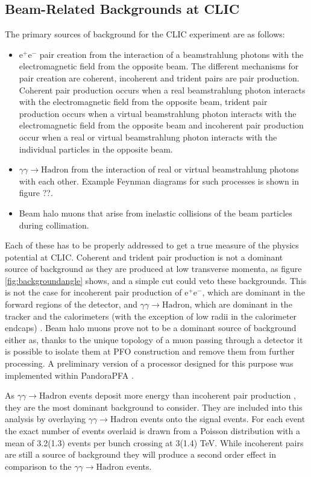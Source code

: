\subsection{Beam-Related Backgrounds at CLIC}
The primary sources of background for the CLIC experiment are as follows:
\begin{itemize}
\item $\text{e}^{+}\text{e}^{-}$ pair creation from the interaction of a beamstrahlung photons with the electromagnetic field from the opposite beam.  The different mechanisms for pair creation are coherent, incoherent and trident pairs are pair production.  Coherent pair production occurs when a real beamstrahlung photon interacts with the electromagnetic field from the opposite beam, trident pair production occurs when a virtual beamstrahlung photon interacts with the electromagnetic field from the opposite beam and incoherent pair production occur when a real or virtual beamstrahlung photon interacts with the individual particles in the opposite beam.  
\item $\gamma\gamma \rightarrow \text{Hadron}$ from the interaction of real or virtual beamstrahlung photons with each other.  Example Feynman diagrams for such processes is shown in figure ??. 
\item Beam halo muons that arise from inelastic collisions of the beam particles during collimation.
\end{itemize}

Each of these has to be properly addressed to get a true measure of the physics potential at CLIC.  Coherent and trident pair production is not a dominant source of background as they are produced at low transverse momenta, as figure \ref{fig:backgroundangle} shows, and a simple cut could veto these backgrounds.  This is not the case for incoherent pair production of $\text{e}^{+}\text{e}^{-}$, which are dominant in the forward regions of the detector, and $\gamma\gamma \rightarrow \text{Hadron}$, which are dominant in the tracker and the calorimeters (with the exception of low radii in the calorimeter endcaps) \cite{Linssen:2012hp, Sailer:2012mfa}.  Beam halo muons prove not to be a dominant source of background either as, thanks to the unique topology of a muon passing through a detector it is possible to isolate them at PFO construction and remove them from further processing.  A preliminary version of a processor designed for this purpose was implemented within PandoraPFA \cite{Linssen:2012hp}.  

As $\gamma\gamma \rightarrow \text{Hadron}$ events deposit more energy than incoherent pair production \cite{Linssen:2012hp}, they are the most dominant background to consider.  They are included into this analysis by overlaying $\gamma\gamma \rightarrow \text{Hadron}$ events onto the signal events.  For each event the exact number of events overlaid is drawn from a Poisson distribution with a mean of 3.2(1.3) events per bunch crossing at 3(1.4) TeV.  While incoherent pairs are still a source of background they will produce a second order effect in comparison to the $\gamma\gamma \rightarrow \text{Hadron}$ events.

